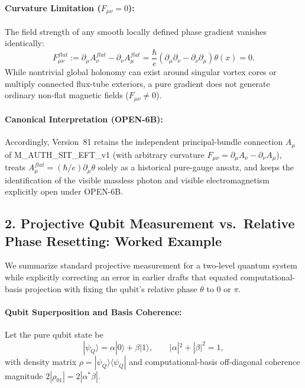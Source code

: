 \documentclass[american,11pt,letterpaper]{article}
\def\mathrm#1{#1}%
\def\texttt#1{#1}%
\def\emph#1{#1}%
\begin{document}
\paragraph{Curvature Limitation ($F_{\mu\nu} = 0$):}
The field strength of any smooth locally defined phase gradient vanishes identically:
\[
F_{\mu\nu}^{\mathrm{flat}} := \partial_\mu A_\nu^{\mathrm{flat}} - \partial_\nu A_\mu^{\mathrm{flat}} = \frac{\hbar}{e} (\partial_\mu \partial_\nu - \partial_\nu \partial_\mu)\theta(x) = 0.
\]
While nontrivial global holonomy can exist around singular vortex cores or multiply connected flux-tube exteriors, a pure gradient does \emph{not} generate ordinary non-flat magnetic fields ($F_{\mu\nu} \ne 0$).

\paragraph{Canonical Interpretation (\texttt{OPEN-6B}):}
Accordingly, Version~81 retains the independent principal-bundle connection $A_\mu$ of \texttt{M\_AUTH\_SIT\_EFT\_v1} (with arbitrary curvature $F_{\mu\nu} = \partial_\mu A_\nu - \partial_\nu A_\mu$), treats $A_\mu^{\mathrm{flat}} = (\hbar/e)\partial_\mu\theta$ solely as a historical pure-gauge ansatz, and keeps the identification of the visible massless photon and visible electromagnetism explicitly open under \texttt{OPEN-6B}.

\subsection{2. Projective Qubit Measurement vs.\ Relative Phase Resetting: Worked Example}

We summarize standard projective measurement for a two-level quantum system while explicitly correcting an error in earlier drafts that equated computational-basis projection with fixing the qubit's relative phase $\theta$ to $0$ or $\pi$.

\paragraph{Qubit Superposition and Basis Coherence:}
Let the pure qubit state be
\[
|\psi_{\mathrm{Q}}\rangle = \alpha |0\rangle + \beta |1\rangle, \qquad |\alpha|^2 + |\beta|^2 = 1,
\]
with density matrix $\rho = |\psi_{\mathrm{Q}}\rangle\langle\psi_{\mathrm{Q}}|$ and computational-basis off-diagonal coherence magnitude $2|\rho_{01}| = 2|\alpha^*\beta|$.
\end{document}
